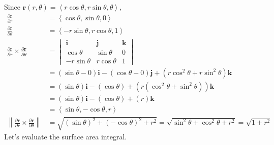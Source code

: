 \documentclass{article}
\newcommand{\lrp}[1]{\left( #1 \right)}
\newcommand{\lra}[1]{\left\langle #1 \right\rangle}
\newcommand{\norm}[1]{\left\lVert #1 \right\rVert}
\renewcommand{\i}[0]{\mathbf{{i}}}
\renewcommand{\j}[0]{\mathbf{{j}}}
\renewcommand{\k}[0]{\mathbf{{k}}}
\renewcommand{\r}[0]{\mathbf{r}}
\begin{document}
Since $\r(r,\theta)=\lra{r\cos\theta, r\sin\theta,\theta}$,
\begin{align*}
    \frac{\partial \r}{\partial r}&=\lra{\cos\theta, \sin\theta, 0}\\
    \frac{\partial \r }{\partial \theta}&=\lra{-r\sin\theta, r\cos\theta, 1}\\
    \frac{\partial \r}{\partial r}\times \frac{\partial \r}{\partial \theta}&=\begin{vmatrix}\i & \j & \k \\ \cos\theta& \sin \theta & 0\\ -r\sin\theta & r\cos\theta & 1\end{vmatrix}\\
    &=\lrp{\sin\theta - 0}\i -\lrp{\cos\theta - 0}\j + \lrp{r\cos^2\theta + r\sin^2\theta}\k\\
    &=\lrp{\sin\theta}\i-\lrp{\cos\theta}+\lrp{r\lrp{\cos^2\theta+\sin^2\theta}}\k\\
    &=\lrp{\sin\theta}\i-\lrp{\cos\theta}+\lrp{r}\k\tag{$\cos^2\theta+\sin^2\theta=1$}\\
    &=\lra{\sin\theta,-\cos\theta, r}\\
    \norm{\frac{\partial \r}{\partial r}\times \frac{\partial \r}{\partial \theta}}&=\sqrt{\lrp{\sin\theta}^2+\lrp{-\cos\theta}^2+r^2}=\sqrt{\sin^2\theta+\cos^2\theta+r^2}=\sqrt{1+r^2}\tag{$\sin^2\theta+\cos^2\theta=1$}
\end{align*}
Let's evaluate the surface area integral.
\end{document}
